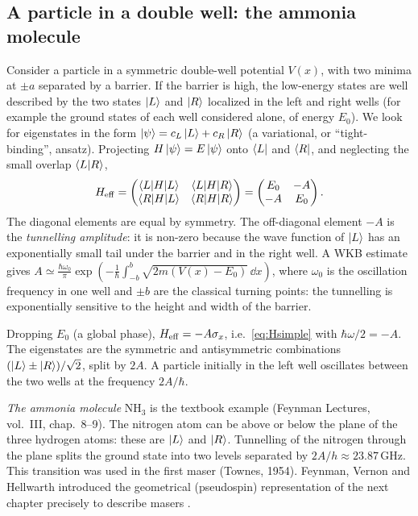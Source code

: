 \subsection{A particle in a double well: the ammonia molecule}\label{sec:doublewell}
\begin{origin}
Consider a particle in a symmetric double-well potential $V(x)$, with two minima at $\pm a$ separated by a barrier. If the barrier
is high, the low-energy states are well described by the two states $\left|L\right\rangle$ and $\left|R\right\rangle$ localized in the left and right wells
(for example the ground states of each well considered alone, of energy $E_0$). We look for eigenstates in the form
$\left|\psi\right\rangle=c_L\left|L\right\rangle+c_R\left|R\right\rangle$ (a variational, or ``tight-binding'', ansatz). Projecting $H\left|\psi\right\rangle=E\left|\psi\right\rangle$ onto $\left\langle L\right|$ and $\left\langle R\right|$,
and neglecting the small overlap $\left\langle L\middle|R\right\rangle$,
\begin{equation}
  H_{\rm eff}=\begin{pmatrix}\left\langle L\middle|H\middle|L\right\rangle&\left\langle L\middle|H\middle|R\right\rangle\\ \left\langle R\middle|H\middle|L\right\rangle&\left\langle R\middle|H\middle|R\right\rangle\end{pmatrix}=\begin{pmatrix}E_0&-A\\-A&E_0\end{pmatrix}.
\end{equation}
The diagonal elements are equal by symmetry. The off-diagonal element $-A$ is the \emph{tunnelling amplitude}: it is non-zero because the
wave function of $\left|L\right\rangle$ has an exponentially small tail under the barrier and in the right well. A WKB estimate gives
$A\simeq\frac{\hbar\omega_0}{\pi}\exp\left(-\frac1\hbar\int_{-b}^{b}\sqrt{2m(V(x)-E_0)}\,\dd x\right)$, where $\omega_0$ is the oscillation
frequency in one well and $\pm b$ are the classical turning points: the tunnelling is exponentially sensitive to the height and width of the barrier.

Dropping $E_0$ (a global phase), $H_{\rm eff}=-A\sigma_x$, i.e.\ \cref{eq:Hsimple} with $\hbar\omega/2=-A$. The eigenstates are the
symmetric and antisymmetric combinations $(\left|L\right\rangle\pm\left|R\right\rangle)/\sqrt2$, split by $2A$. A particle initially in the left well oscillates
between the two wells at the frequency $2A/\hbar$.

\emph{The ammonia molecule} NH$_3$ is the textbook example (Feynman Lectures, vol.~III, chap.~8--9). The nitrogen atom can be above or
below the plane of the three hydrogen atoms: these are $\left|L\right\rangle$ and $\left|R\right\rangle$. Tunnelling of the nitrogen through the plane splits the
ground state into two levels separated by $2A/h\approx23.87$\,GHz. This transition was used in the first maser (Townes, 1954). Feynman,
Vernon and Hellwarth introduced the geometrical (pseudospin) representation of the next chapter precisely to describe masers \cite{FVH1957}.
\end{origin}

